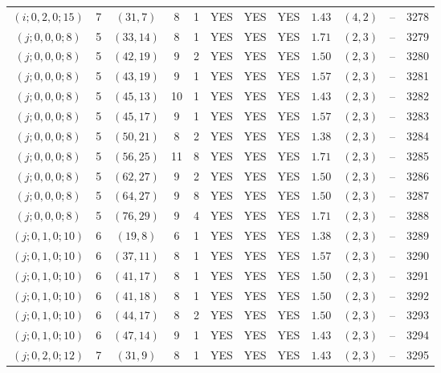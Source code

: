 \begin{longtable}{|c|c|c|c|c|c|c|c|c|c|c|c|}
$(i;0,2,0;15)$ & 7 & $(31,7)$ & 8 & 1 & YES & YES & YES & $1.43$ & $(4,2)$ & -- & 3278\\
$(j;0,0,0;8)$ & 5 & $(33,14)$ & 8 & 1 & YES & YES & YES & $1.71$ & $(2,3)$ & -- & 3279\\
$(j;0,0,0;8)$ & 5 & $(42,19)$ & 9 & 2 & YES & YES & YES & $1.50$ & $(2,3)$ & -- & 3280\\
$(j;0,0,0;8)$ & 5 & $(43,19)$ & 9 & 1 & YES & YES & YES & $1.57$ & $(2,3)$ & -- & 3281\\
$(j;0,0,0;8)$ & 5 & $(45,13)$ & 10 & 1 & YES & YES & YES & $1.43$ & $(2,3)$ & -- & 3282\\
$(j;0,0,0;8)$ & 5 & $(45,17)$ & 9 & 1 & YES & YES & YES & $1.57$ & $(2,3)$ & -- & 3283\\
$(j;0,0,0;8)$ & 5 & $(50,21)$ & 8 & 2 & YES & YES & YES & $1.38$ & $(2,3)$ & -- & 3284\\
$(j;0,0,0;8)$ & 5 & $(56,25)$ & 11 & 8 & YES & YES & YES & $1.71$ & $(2,3)$ & -- & 3285\\
$(j;0,0,0;8)$ & 5 & $(62,27)$ & 9 & 2 & YES & YES & YES & $1.50$ & $(2,3)$ & -- & 3286\\
$(j;0,0,0;8)$ & 5 & $(64,27)$ & 9 & 8 & YES & YES & YES & $1.50$ & $(2,3)$ & -- & 3287\\
$(j;0,0,0;8)$ & 5 & $(76,29)$ & 9 & 4 & YES & YES & YES & $1.71$ & $(2,3)$ & -- & 3288\\
$(j;0,1,0;10)$ & 6 & $(19,8)$ & 6 & 1 & YES & YES & YES & $1.38$ & $(2,3)$ & -- & 3289\\
$(j;0,1,0;10)$ & 6 & $(37,11)$ & 8 & 1 & YES & YES & YES & $1.57$ & $(2,3)$ & -- & 3290\\
$(j;0,1,0;10)$ & 6 & $(41,17)$ & 8 & 1 & YES & YES & YES & $1.50$ & $(2,3)$ & -- & 3291\\
$(j;0,1,0;10)$ & 6 & $(41,18)$ & 8 & 1 & YES & YES & YES & $1.50$ & $(2,3)$ & -- & 3292\\
$(j;0,1,0;10)$ & 6 & $(44,17)$ & 8 & 2 & YES & YES & YES & $1.50$ & $(2,3)$ & -- & 3293\\
$(j;0,1,0;10)$ & 6 & $(47,14)$ & 9 & 1 & YES & YES & YES & $1.43$ & $(2,3)$ & -- & 3294\\
$(j;0,2,0;12)$ & 7 & $(31,9)$ & 8 & 1 & YES & YES & YES & $1.43$ & $(2,3)$ & -- & 3295
\end{longtable}
